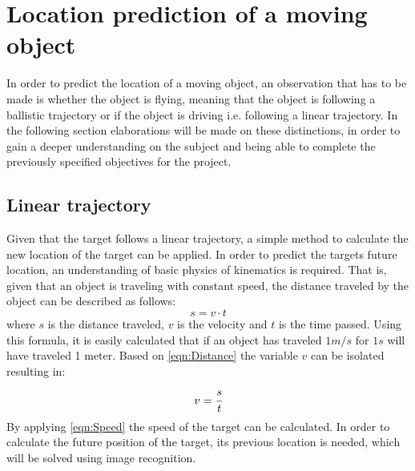 \section{Location prediction of a moving object}
In order to predict the location of a moving object, an observation that has to be made is whether the object is flying, meaning that the object is following a ballistic trajectory or if the object is driving i.e{.} following a linear trajectory. 
In the following section elaborations will be made on these distinctions, in order to gain a deeper understanding on the subject and being able to complete the previously specified objectives for the project. 
\subsection{Linear trajectory}
Given that the target follows a linear trajectory, a simple method to calculate the new location of the target can be applied.
In order to predict the targets future location, an understanding of basic physics of kinematics is required. 
That is, given that an object is traveling with constant speed, the distance traveled by the object can be described as follows:
\begin{equation}\label{eqn:Distance}
s = v \cdot t
\end{equation}
where $ s $ is the distance traveled, $ v $ is the velocity and $ t $ is the time passed.
Using this formula, it is easily calculated that if an object has traveled $ 1 m/s $ for $ 1 s $ will have traveled 1 meter. 
Based on \autoref{eqn:Distance} the variable $ v $ can be isolated resulting in:
\begin{equation}\label{eqn:Speed}
v = \cfrac{s}{t}
\end{equation}
By applying \autoref{eqn:Speed} the speed of the target can be calculated. 
In order to calculate the future position of the target, its previous location is needed, which will be solved using image recognition.

%
